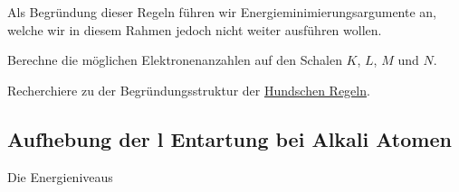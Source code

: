 \documentclass{subfiles}
\begin{document}
            Als Begründung dieser Regeln führen wir Energieminimierungsargumente an, welche wir in diesem Rahmen jedoch nicht weiter ausführen wollen. 
 
        \begin{Aufgabe}
            \nr{} Berechne die möglichen Elektronenanzahlen auf den Schalen $K$, $L$, $M$ und $N$.

            \nr{} Recherchiere zu der Begründungsstruktur der \href{https://de.wikipedia.org/wiki/Hundsche_Regeln}{Hundschen Regeln}.
        \end{Aufgabe}

    \subsection{Aufhebung der l Entartung bei Alkali Atomen}
        Die Energieniveaus 
\end{document}
